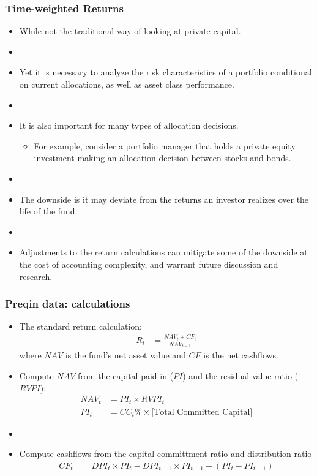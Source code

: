 \documentclass[10pt, compress]{beamer}
\begin{document}
\begin{frame}[fragile]
\frametitle{Time-weighted Returns} \label{fr:motivation}
\begin{itemize}
    \item  While not the traditional way of looking at private capital. 
    \item []
    \item Yet it is necessary to analyze the risk characteristics of a portfolio conditional on current allocations, as well as asset class performance.
    \item []
    \item It is also important for many types of allocation decisions.
    \begin{itemize}
        \item For example, consider a portfolio manager that holds a private equity investment making an allocation decision between stocks and bonds.
    \end{itemize}
    \item []
    \item The downside is it may deviate from the returns an investor realizes over the life of the fund.
    \item []
    \item Adjustments to the return calculations can mitigate some of the downside at the cost of accounting complexity, and warrant future discussion and research.
\end{itemize}
\end{frame}


\begin{frame}[fragile]
\frametitle{Preqin data: calculations} \label{fr:motivation}
\begin{itemize}
    \item  The standard return calculation:
    \begin{align*}
        R_t &= \frac{NAV_t + CF_t}{NAV_{t-1}}
    \end{align*}
    where $NAV$ is the fund's net asset value and $CF$ is the net cashflows.
    \item Compute $NAV$ from the capital paid in ($PI$) and the residual value ratio ($RVPI$):
    \begin{align*}
        NAV_t &= PI_t\times RVPI_t\\
        PI_t &= CC_t\% \times \text{[Total Committed Capital]}
    \end{align*}
    \item []
    \item Compute cashflows from the capital committment ratio and distribution ratio
    \begin{align*}
        CF_t &= DPI_t\times PI_t - DPI_{t-1} \times PI_{t-1}- \left(PI_t-PI_{t-1}\right)
    \end{align*}
\end{itemize}
\end{frame}
\end{document}
